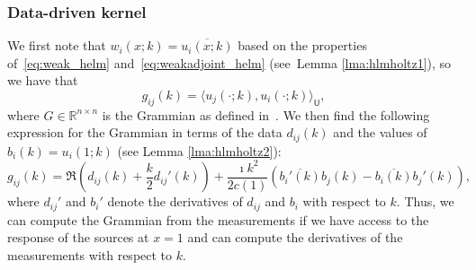 \documentclass[12pt]{amsart}
\newcommand{\yy}[1]{\textcolor{blue}{{YY: #1}}}
\begin{document}
\subsubsection{Data-driven kernel}
We first note that $w_i(x;k) = \overline{u_i(x;k)}$ based on the properties of~\eqref{eq:weak_helm} and~\eqref{eq:weakadjoint_helm} (see~Lemma \ref{lma:hlmholtz1}), so  we have that %
\[
g_{ij}(k) = \langle u_j(\cdot;k), u_i(\cdot;k)\rangle_{\mathsf{U}},
\]
where $G\in \mathbb{R}^{n\times n}$ is the Grammian as defined in~. We then find the following expression for the Grammian in terms of the data $d_{ij}(k)$ and the values of $b_i(k) = u_i(1;k)$ (see Lemma \ref{lma:hlmholtz2}):
\begin{equation}
\label{eq:data_gram_helm}
g_{ij}(k) = \Re\left(d_{ij}(k) + {\textstyle\frac{k}{2}}d_{ij}'(k)\right) + {\textstyle\frac{\imath k^2}{2c(1)}}\left(\overline{b_i'(k)}b_j(k) - \overline{b_i(k)}b_j'(k)\right),
\end{equation}
where $d_{ij}'$ and $b_i'$ denote the derivatives of $d_{ij}$ and $b_i$ with respect to $k$. Thus, we can compute the Grammian from the measurements if we have access to the response of the sources at $x=1$ and can compute the derivatives of the measurements with respect to $k$.

\end{document}
